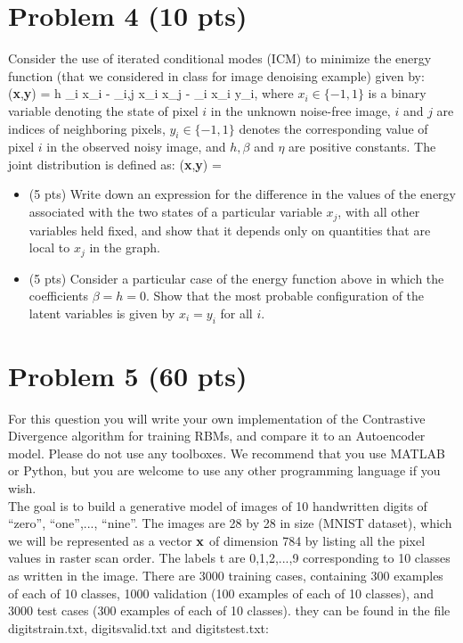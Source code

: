 \documentclass[10pt]{article}
\def\beqa#1\eeqa{\begin{eqnarray}#1\end{eqnarray}}
\newcommand{\bx}{{\bf{x}}}
\newcommand{\by}{{\bf{y}}}
\newcommand{\Z}{{\cal{Z}}}
\begin{document}
\section*{Problem 4 (10 pts)}
Consider the use of iterated conditional modes (ICM) to minimize the energy function (that we considered in class for image denoising example) given by:
\beqa
E(\bx,\by) = h \sum_i x_i - \beta \sum_{i,j} x_i x_j - \eta \sum_i x_i y_i,
\eeqa
where $x_i \in \{-1,1\}$ is a binary variable denoting the state of 
pixel $i$ in the unknown noise-free image, $i$ and $j$ are indices of
neighboring pixels, 
$y_i \in \{-1,1\}$ denotes the corresponding value of pixel $i$ in the 
observed noisy image, and $h, \beta$ and $\eta$ are positive constants.
The joint distribution is defined as:
\beqa
p(\bx,\by) = \frac{1}{\Z} \exp{(-E(\bx,\by)}
\eeqa

\begin{itemize}
\item (5 pts)
Write down an expression for the difference in the 
values of the energy associated with the two states of a particular 
variable $x_j$, with all other variables held fixed, and show that it depends only on quantities that are local to $x_j$ in the graph.
\item (5 pts)
Consider a particular case of the energy function above 
in which the coefficients $\beta = h = 0$. 
Show that the most probable configuration of the latent variables is 
given by $x_i = y_i$ for all $i$.
\end{itemize}

\section*{Problem 5 (60 pts)}

For this question you will 
write your own implementation of the Contrastive Divergence algorithm 
for training RBMs, and compare it to an Autoencoder model. 
Please do not use any toolboxes. 
We recommend that you use MATLAB or Python, but you are welcome
to use any other programming language if you wish. 
\\
 
The goal is to build a generative model of images of
10 handwritten digits of ``zero'', ``one'',..., ``nine''.
The images are 28 by 28 in size (MNIST dataset), which we will be represented
as a vector $\bx$ of dimension 784 by listing all the pixel values in
raster scan order. The labels t are 0,1,2,...,9 corresponding to
10 classes as written in the image.
There are 3000 training cases, containing 300 examples of each of 10
classes,
1000 validation (100 examples of each of 10 classes), and 3000
test cases (300 examples of each of 10 classes).
they can be found in the file digitstrain.txt, digitsvalid.txt
 and digitstest.txt: \\
\end{document}
